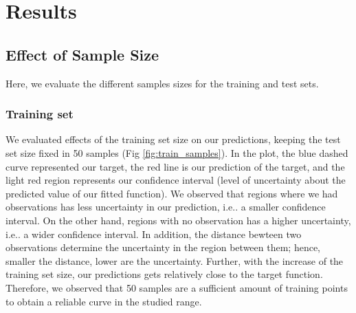 \documentclass{article}
\makeatletter
\DeclareRobustCommand\onedot{\futurelet\@let@token\@onedot}
\def\@onedot{\ifx\@let@token.\else.\null\fi\xspace}
\def\ie{i.e\onedot} \def\Ie{I.e\onedot}
\makeatother
\begin{document}
\section{Results}

\subsection{Effect of Sample Size}

Here, we evaluate the different samples sizes for the training and test sets. 

\subsubsection{Training set}
We evaluated effects of the training set size on our predictions, keeping the test set size fixed in 50 samples (Fig \ref{fig:train_samples}). In the plot, the blue dashed curve represented our target, the red line is our prediction of the target, and the light red region represents our confidence interval (level of uncertainty about the predicted value of our fitted function). We observed that regions where we had observations has less uncertainty in our prediction, \ie a smaller confidence interval. On the other hand, regions with no observation has a higher uncertainty, \ie a wider confidence interval. In addition, the distance bewteen two observations determine the uncertainty in the region between them; hence, smaller the distance, lower are the uncertainty. Further, with the increase of the training set size, our predictions gets relatively close to the target function. Therefore, we observed that 50 samples are a sufficient amount of training points to obtain a reliable curve in the studied range.
\end{document}
